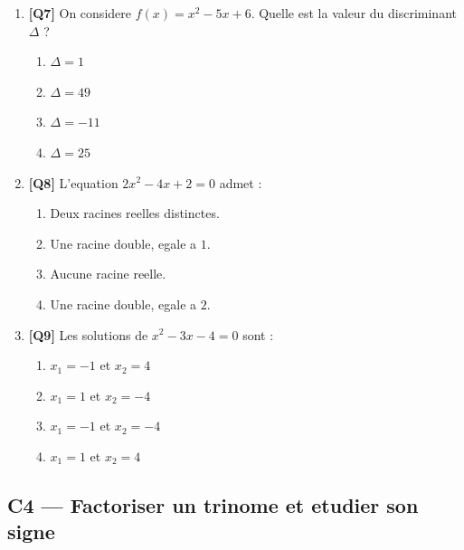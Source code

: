 \begin{enumerate}[resume]

\item \textbf{[Q7]} On considere $f(x) = x^2 - 5x + 6$.
  Quelle est la valeur du discriminant $\Delta$ ?

  \begin{enumerate}[label=\Alph*.]
    \item $\Delta = 1$
    \item $\Delta = 49$
    \item $\Delta = -11$
    \item $\Delta = 25$
  \end{enumerate}

\bigskip

\item \textbf{[Q8]} L'equation $2x^2 - 4x + 2 = 0$ admet :

  \begin{enumerate}[label=\Alph*.]
    \item Deux racines reelles distinctes.
    \item Une racine double, egale a $1$.
    \item Aucune racine reelle.
    \item Une racine double, egale a $2$.
  \end{enumerate}

\bigskip

\item \textbf{[Q9]} Les solutions de $x^2 - 3x - 4 = 0$ sont :

  \begin{enumerate}[label=\Alph*.]
    \item $x_1 = -1$ et $x_2 = 4$
    \item $x_1 = 1$ et $x_2 = -4$
    \item $x_1 = -1$ et $x_2 = -4$
    \item $x_1 = 1$ et $x_2 = 4$
  \end{enumerate}

\end{enumerate}

\bigskip

\subsection*{C4 — Factoriser un trinome et etudier son signe}


